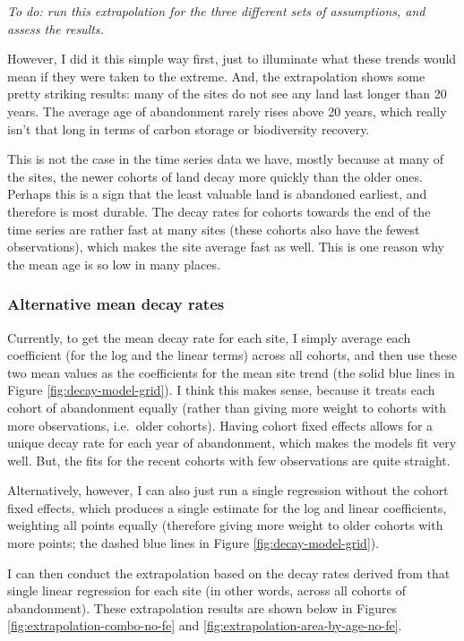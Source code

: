 \documentclass[
]{article}
\begin{document}
\emph{To do: run this extrapolation for the three different sets of assumptions, and assess the results.}

However, I did it this simple way first, just to illuminate what these trends would mean if they were taken to the extreme.
And, the extrapolation shows some pretty striking results: many of the sites do not see any land last longer than 20 years.
The average age of abandonment rarely rises above 20 years, which really isn't that long in terms of carbon storage or biodiversity recovery.

This is not the case in the time series data we have, mostly because at many of the sites, the newer cohorts of land decay more quickly than the older ones.
Perhaps this is a sign that the least valuable land is abandoned earliest, and therefore is most durable.
The decay rates for cohorts towards the end of the time series are rather fast at many sites (these cohorts also have the fewest observations), which makes the site average fast as well.
This is one reason why the mean age is so low in many places.

\hypertarget{alternative-mean-decay-rates}{%
\subsubsection{Alternative mean decay rates}\label{alternative-mean-decay-rates}}

Currently, to get the mean decay rate for each site, I simply average each coefficient (for the log and the linear terms) across all cohorts, and then use these two mean values as the coefficients for the mean site trend (the solid blue lines in Figure \ref{fig:decay-model-grid}).
I think this makes sense, because it treats each cohort of abandonment equally (rather than giving more weight to cohorts with more observations, i.e.~older cohorts).
Having cohort fixed effects allows for a unique decay rate for each year of abandonment, which makes the models fit very well.
But, the fits for the recent cohorts with few observations are quite straight.

Alternatively, however, I can also just run a single regression without the cohort fixed effects, which produces a single estimate for the log and linear coefficients, weighting all points equally (therefore giving more weight to older cohorts with more points; the dashed blue lines in Figure \ref{fig:decay-model-grid}).

I can then conduct the extrapolation based on the decay rates derived from that single linear regression for each site (in other words, across all cohorts of abandonment).
These extrapolation results are shown below in Figures \ref{fig:extrapolation-combo-no-fe} and \ref{fig:extrapolation-area-by-age-no-fe}.
\end{document}
